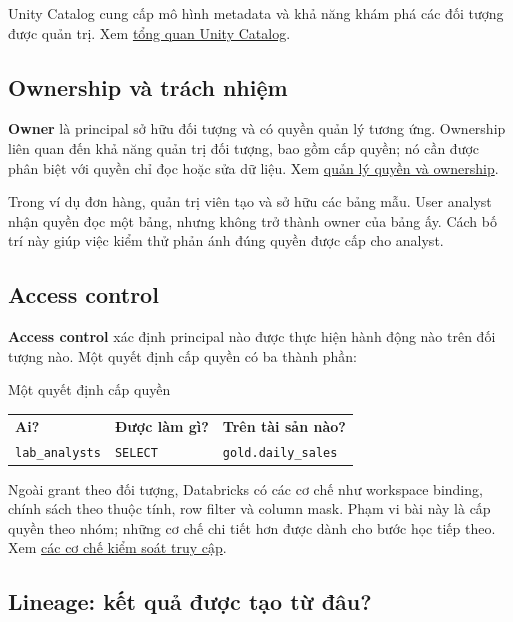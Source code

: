 Unity Catalog cung cấp mô hình metadata và khả năng khám phá các đối tượng được quản trị. Xem \href{https://docs.databricks.com/aws/en/data-governance/unity-catalog/}{tổng quan Unity Catalog}.


\FloatBarrier
{}
\subsection{Ownership và trách nhiệm}

\textbf{Owner} là principal sở hữu đối tượng và có quyền quản lý tương ứng. Ownership liên quan đến khả năng quản trị đối tượng, bao gồm cấp quyền; nó cần được phân biệt với quyền chỉ đọc hoặc sửa dữ liệu. Xem \href{https://docs.databricks.com/aws/en/data-governance/unity-catalog/manage-privileges/}{quản lý quyền và ownership}.


Trong ví dụ đơn hàng, quản trị viên tạo và sở hữu các bảng mẫu. User analyst nhận quyền đọc một bảng, nhưng không trở thành owner của bảng ấy. Cách bố trí này giúp việc kiểm thử phản ánh đúng quyền được cấp cho analyst.


\FloatBarrier
{}
\subsection{Access control}

\textbf{Access control} xác định principal nào được thực hiện hành động nào trên đối tượng nào. Một quyết định cấp quyền có ba thành phần:


\begin{examplebox}{Một quyết định cấp quyền}
\begin{tabularx}{\linewidth}{@{}YYY@{}}
\textbf{Ai?} & \textbf{Được làm gì?} & \textbf{Trên tài sản nào?}\\
\texttt{lab\_analysts} & \texttt{SELECT} & \texttt{gold.daily\_sales}
\end{tabularx}
\end{examplebox}

Ngoài grant theo đối tượng, Databricks có các cơ chế như workspace binding, chính sách theo thuộc tính, row filter và column mask. Phạm vi bài này là cấp quyền theo nhóm; những cơ chế chi tiết hơn được dành cho bước học tiếp theo. Xem \href{https://docs.databricks.com/aws/en/data-governance/unity-catalog/access-control/}{các cơ chế kiểm soát truy cập}.


\FloatBarrier
{}
\subsection{Lineage: kết quả được tạo từ đâu?}

